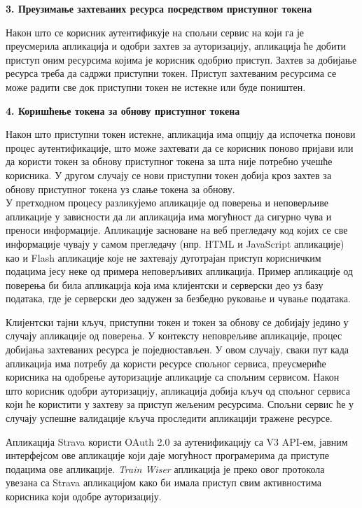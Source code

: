 \documentclass[12pt,oneside]{memoir}
\begin{document}

\textbf{3. Преузимање захтеваних ресурса посредством приступног токена}

Након што се корисник аутентификује на спољни сервис на који га је преусмерила апликација и одобри захтев за ауторизацију,
апликација ће добити приступ оним ресурсима којима је корисник одобрио приступ. Захтев за добијање ресурса треба да садржи приступни токен. 
Приступ захтеваним ресурсима се може радити све док приступни токен не истекне или буде поништен.


\textbf{4. Коришћење токена за обнову приступног токена}

Након што приступни токен истекне, апликација има опцију да испочетка понови процес аутентификације, што може захтевати да се корисник поново пријави или да користи токен за обнову приступног токена за шта није потребно учешће корисника. У другом случају се нови приступни токен добија кроз захтев за обнову приступног токена уз слање токена за обнову. \\

У претходном процесу разликујемо апликације од поверења и неповерљиве апликације у зависности да ли 
апликација има могућност да сигурно чува и преноси информације. 
Апликације засноване на веб прегледачу код којих се све информације чувају у самом прегледачу (нпр. HTML и JavaScript апликације) као и Flash апликације које не захтевају дуготрајан приступ корисничким подацима јесу неке од примера неповерљивих апликација. Пример апликације од поверења би била апликација која има клијентски и серверски део уз базу података, где је серверски део задужен за безбедно руковање и чување података.

Клијентски тајни кључ, приступни токен и токен за обнову се добијају једино у случају апликације од поверења. 
У контексту неповрељиве апликације, процес добијања захтеваних ресурса је поједностављен. У овом случају, 
сваки пут када апликација има потребу да користи ресурсе спољног сервиса, преусмериће корисника на одобрење 
ауторизације апликације са спољним сервисом. Након што корисник одобри ауторизацију, апликација добија кључ 
од спољног сервиса који ће користити у захтеву за приступ жељеним ресурсима. Спољни сервис ће у случају успешне
валидације кључа проследити апликацији тражене ресурсе. \cite{mastering_oauth2}

Апликација Strava користи OAuth 2.0 \cite{strava_api_oauth2} за аутенификацију са V3 API-ем, 
јавним интерфејсом ове апликације који даје могућност програмерима да приступе подацима ове апликације. \textit{Train Wiser} апликација је преко овог протокола увезана са Strava апликацијом како би имала приступ свим активностима корисника који одобре ауторизацију. 
\end{document}
